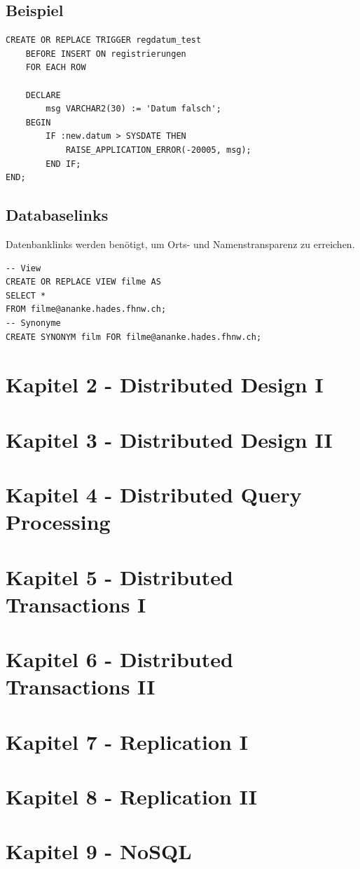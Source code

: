 \documentclass[a4paper,11pt]{article}
\begin{document}
\subsection{Beispiel}
\begin{lstlisting}[style=sql, title=Trigger]
CREATE OR REPLACE TRIGGER regdatum_test
	BEFORE INSERT ON registrierungen
	FOR EACH ROW
	
	DECLARE
		msg VARCHAR2(30) := 'Datum falsch';
	BEGIN
		IF :new.datum > SYSDATE THEN
			RAISE_APPLICATION_ERROR(-20005, msg);
		END IF;
END;
\end{lstlisting}
\subsection{Databaselinks}
Datenbanklinks werden benötigt, um Orts- und Namenstransparenz zu erreichen.
\begin{lstlisting}[style=sql, title=Databaselinks]
-- View
CREATE OR REPLACE VIEW filme AS
SELECT *
FROM filme@ananke.hades.fhnw.ch;
-- Synonyme
CREATE SYNONYM film FOR filme@ananke.hades.fhnw.ch;
\end{lstlisting}
\section{Kapitel 2 - Distributed Design I}
\section{Kapitel 3 - Distributed Design II}
\section{Kapitel 4 - Distributed Query Processing}
\section{Kapitel 5 - Distributed Transactions I}
\section{Kapitel 6 - Distributed Transactions II}
\section{Kapitel 7 - Replication I}
\section{Kapitel 8 - Replication II}
\section{Kapitel 9 - NoSQL}
\end{document}
